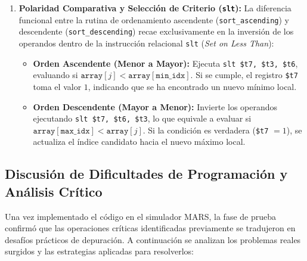 \documentclass[12pt,a4paper]{article}
\begin{document}
\begin{enumerate}[leftmargin=*]
    \item \textbf{Polaridad Comparativa y Selección de Criterio (\texttt{slt}):}
    La diferencia funcional entre la rutina de ordenamiento ascendente (\texttt{sort\_ascending}) y descendente (\texttt{sort\_descending}) recae exclusivamente en la inversión de los operandos dentro de la instrucción relacional \texttt{slt} (\textit{Set on Less Than}):
    \begin{itemize}
        \item \textbf{Orden Ascendente (Menor a Mayor):} Ejecuta \texttt{slt \$t7, \$t3, \$t6}, evaluando si $\mathtt{array}[j] < \mathtt{array}[\mathtt{min\_idx}]$. Si se cumple, el registro \texttt{\$t7} toma el valor $1$, indicando que se ha encontrado un nuevo mínimo local.
        \item \textbf{Orden Descendente (Mayor a Menor):} Invierte los operandos ejecutando \texttt{slt \$t7, \$t6, \$t3}, lo que equivale a evaluar si $\mathtt{array}[\mathtt{max\_idx}] < \mathtt{array}[j]$. Si la condición es verdadera (\texttt{\$t7} $= 1$), se actualiza el índice candidato hacia el nuevo máximo local.
    \end{itemize}
\end{enumerate}

\subsection{Discusión de Dificultades de Programación y Análisis Crítico}

Una vez implementado el código en el simulador MARS, la fase de prueba confirmó que las operaciones críticas identificadas previamente se tradujeron en desafíos prácticos de depuración. A continuación se analizan los problemas reales surgidos y las estrategias aplicadas para resolverlos:
\end{document}
